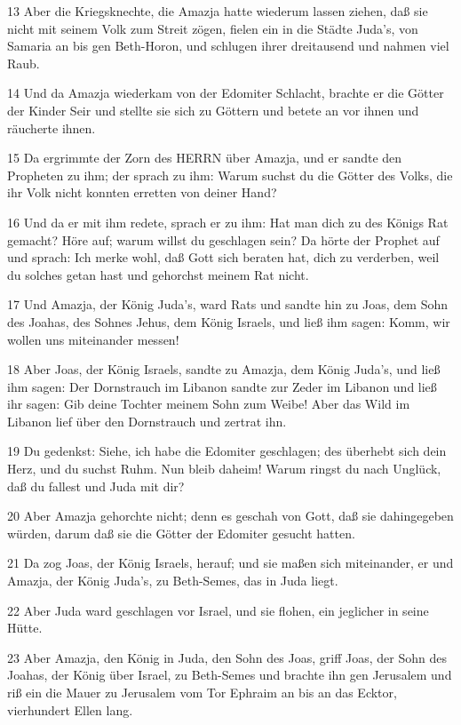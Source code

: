\par 13 Aber die Kriegsknechte, die Amazja hatte wiederum lassen ziehen, daß sie nicht mit seinem Volk zum Streit zögen, fielen ein in die Städte Juda's, von Samaria an bis gen Beth-Horon, und schlugen ihrer dreitausend und nahmen viel Raub.
\par 14 Und da Amazja wiederkam von der Edomiter Schlacht, brachte er die Götter der Kinder Seir und stellte sie sich zu Göttern und betete an vor ihnen und räucherte ihnen.
\par 15 Da ergrimmte der Zorn des HERRN über Amazja, und er sandte den Propheten zu ihm; der sprach zu ihm: Warum suchst du die Götter des Volks, die ihr Volk nicht konnten erretten von deiner Hand?
\par 16 Und da er mit ihm redete, sprach er zu ihm: Hat man dich zu des Königs Rat gemacht? Höre auf; warum willst du geschlagen sein? Da hörte der Prophet auf und sprach: Ich merke wohl, daß Gott sich beraten hat, dich zu verderben, weil du solches getan hast und gehorchst meinem Rat nicht.
\par 17 Und Amazja, der König Juda's, ward Rats und sandte hin zu Joas, dem Sohn des Joahas, des Sohnes Jehus, dem König Israels, und ließ ihm sagen: Komm, wir wollen uns miteinander messen!
\par 18 Aber Joas, der König Israels, sandte zu Amazja, dem König Juda's, und ließ ihm sagen: Der Dornstrauch im Libanon sandte zur Zeder im Libanon und ließ ihr sagen: Gib deine Tochter meinem Sohn zum Weibe! Aber das Wild im Libanon lief über den Dornstrauch und zertrat ihn.
\par 19 Du gedenkst: Siehe, ich habe die Edomiter geschlagen; des überhebt sich dein Herz, und du suchst Ruhm. Nun bleib daheim! Warum ringst du nach Unglück, daß du fallest und Juda mit dir?
\par 20 Aber Amazja gehorchte nicht; denn es geschah von Gott, daß sie dahingegeben würden, darum daß sie die Götter der Edomiter gesucht hatten.
\par 21 Da zog Joas, der König Israels, herauf; und sie maßen sich miteinander, er und Amazja, der König Juda's, zu Beth-Semes, das in Juda liegt.
\par 22 Aber Juda ward geschlagen vor Israel, und sie flohen, ein jeglicher in seine Hütte.
\par 23 Aber Amazja, den König in Juda, den Sohn des Joas, griff Joas, der Sohn des Joahas, der König über Israel, zu Beth-Semes und brachte ihn gen Jerusalem und riß ein die Mauer zu Jerusalem vom Tor Ephraim an bis an das Ecktor, vierhundert Ellen lang.
